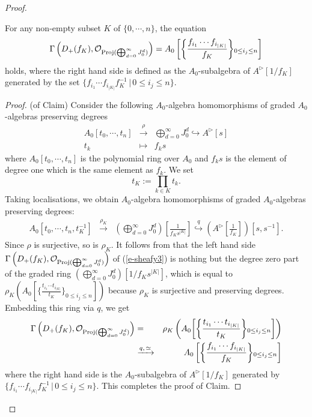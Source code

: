 \begin{proof}
\begin{claim}
For any non-empty subset $K$ of $\{0, \cdots, n\}$, 
the equation
\begin{equation}\label{e-sheafy3}
\Gamma\left(D_+(f_K), 
\mathcal{O}_{{\operatorname{Proj}}(\bigoplus_{d=0}^{\infty} J_0^d)}\right)
=A_0\left[\middle\{\frac{f_{i_1}\cdots f_{i_{|K|}}}{f_K}\middle\}_{0 \leq i_j \leq n}\right] 
\end{equation}
holds, where the right hand side is defined as 
the $A_0$-subalgebra of $A^{\rhd}[1/f_K]$ generated by 
the set 
$\{f_{i_1}\cdots f_{i_{|K|}}f_K^{-1}\,|\, 0 \leq i_j \leq n\}$. 
\end{claim}

\begin{proof}(of Claim) 
Consider the following $A_0$-algebra homomorphisms of 
graded $A_0$-algebras preserving degrees 
\begin{eqnarray*}
A_0[t_0, \cdots, t_n] &\xrightarrow{\rho}& \bigoplus_{d=0}^{\infty} J_0^d 
\hookrightarrow A^{\rhd}[s]\\
t_k &\mapsto & f_ks
\end{eqnarray*}
where $A_0[t_0, \cdots, t_n]$ is the polynomial ring over $A_0$ and 
$f_ks$ is the element of degree one 
which is the same element as $f_k$. We set 
$$t_K:=\prod_{k \in K} t_k.$$
Taking localisations, we obtain $A_0$-algebra homomorphisms of 
graded $A_0$-algebras preserving degrees: 
\begin{eqnarray*}
A_0[t_0, \cdots, t_n, t_K^{-1}] &\xrightarrow{\rho_K}& 
\left(\bigoplus_{d=0}^{\infty} J_0^d\right)\left[\frac{1}{f_Ks^{|K|}}\right] 
\overset{q}\hookrightarrow \left(A^{\rhd}\left[\frac{1}{f_K}\right]\right)[s, s^{-1}].
\end{eqnarray*}
Since $\rho$ is surjective, so is $\rho_K$. 
It follows from \cite[Ch. II, Proposition 2.5(b)]{Har77} that 
the left hand side 
$\Gamma\left(D_+(f_K), \mathcal{O}_{{\operatorname{Proj}}(\bigoplus_{d=0}^{\infty} J_0^d)}\right)$ 
of (\ref{e-sheafy3}) is nothing but the degree zero part of 
the graded ring $(\bigoplus_{d=0}^{\infty} J_0^d)[1/f_Ks^{|K|}]$, 
which is equal to 
$\rho_K\left(A_0[\{\frac{t_{i_1} \cdots t_{i_{|K|}}}{t_K}\}_{0 \leq i_j \leq n}]\right)$ 
because $\rho_K$ is surjective and preserving degrees. 
Embedding this ring via $q$, we get 
\begin{eqnarray*}
\Gamma\left(D_+(f_K), \mathcal{O}_{{\operatorname{Proj}}(\bigoplus_{d=0}^{\infty} J_0^d)}\right)
&=&\rho_K\left(A_0\middle[\middle\{\frac{t_{i_1} \cdots t_{i_{|K|}}}{t_K}\middle\}_{0 \leq i_j \leq n}\middle]\right)\\
 &\xrightarrow{q,\, \simeq}& A_0\left[\middle\{\frac{f_{i_1} \cdots f_{i_{|K|}}}{f_K}\middle\}_{0 \leq i_j \leq n}\right]
\end{eqnarray*}
where the right hand side is the $A_0$-subalgebra of $A^{\rhd}[1/f_K]$ 
generated by $\{f_{i_1} \cdots f_{i_{|K|}}f_K^{-1}\,|\,0 \leq i_j \leq n\}$. 
This completes the proof of Claim. 
\end{proof}






\end{proof}
